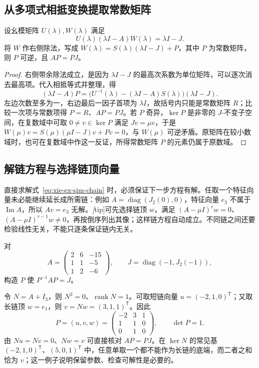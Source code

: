 \subsection{从多项式相抵变换提取常数矩阵}

\begin{proposition}
\label{prop:xie-ex-sim-polynomial-transition}
设幺模矩阵 $U(\lambda),W(\lambda)$ 满足
\[
 U(\lambda)(\lambda I-A)W(\lambda)=\lambda I-J.
\]
将 $W$ 作右侧除法，写成 $W(\lambda)=S(\lambda)(\lambda I-J)+P$，其中 $P$ 为常数矩阵，则 $P$ 可逆，且 $AP=PJ$。
\end{proposition}
\begin{proof}
右侧带余除法成立，是因为 $\lambda I-J$ 的最高次系数为单位矩阵，可以逐次消去最高项。代入相抵等式并整理，得
\[
 (\lambda I-A)P=
 \bigl(U^{-1}(\lambda)-(\lambda I-A)S(\lambda)\bigr)(\lambda I-J).
\]
左边次数至多为一，右边最后一因子首项为 $\lambda I$，故括号内只能是常数矩阵 $R$；比较一次项与常数项得 $P=R$、$AP=PJ$。若 $P$ 奇异，$\ker P$ 是非零的 $J$-不变子空间，在复数域中可取 $0\ne v\in\ker P$ 满足 $Jv=\mu v$，于是 $W(\mu)v=S(\mu)(\mu I-J)v+Pv=0$，与 $W(\mu)$ 可逆矛盾。原矩阵在较小数域时，也可在复数域中作这一反证，所得常数矩阵 $P$ 的元素仍属于原数域。
\end{proof}

\subsection{解链方程与选择链顶向量}

直接求解式~\eqref{eq:xie-ex-sim-chain} 时，必须保证下一步方程有解。任取一个特征向量未必能继续延长成所需链：例如 $A=\operatorname{diag}(J_2(0),0)$，特征向量 $e_3$ 不属于 $\operatorname{Im}A$，所以 $Av=e_3$ 无解。\emph[tip]{可先选择链顶 $w$，满足 $(A-\mu I)^rw=0$、$(A-\mu I)^{r-1}w\ne0$，再按倒序列出其像；这样链方程自动成立。}不同链之间还要检验线性无关，不能只逐条保证链内无关。

\begin{example}
\label{ex:xie-ex-sim-transition}
对
\[
 A=\begin{pmatrix}2&6&-15\\1&1&-5\\1&2&-6\end{pmatrix},
 \qquad J=\operatorname{diag}(-1,J_2(-1)),
\]
构造 $P$ 使 $P^{-1}AP=J$。
\end{example}
\begin{solve}
令 $N=A+I_3$，则 $N^2=0$、$\operatorname{rank}N=1$。可取短链向量 $u=(-2,1,0)^{\mathsf T}$；又取长链顶 $w=e_1$，则 $v=Nw=(3,1,1)^{\mathsf T}$。因此
\[
 P=(u,v,w)=\begin{pmatrix}-2&3&1\\1&1&0\\0&1&0\end{pmatrix},
 \qquad \det P=1.
\]
由 $Nu=Nv=0$、$Nw=v$ 可直接核对 $AP=PJ$。在 $\ker N$ 的常见基 $(-2,1,0)^{\mathsf T}$、$(5,0,1)^{\mathsf T}$ 中，任意单取一个都不能作为长链的底端，而二者之和恰为 $v$；这一例子说明保留参数、检查可解性是必要的。
\end{solve}

